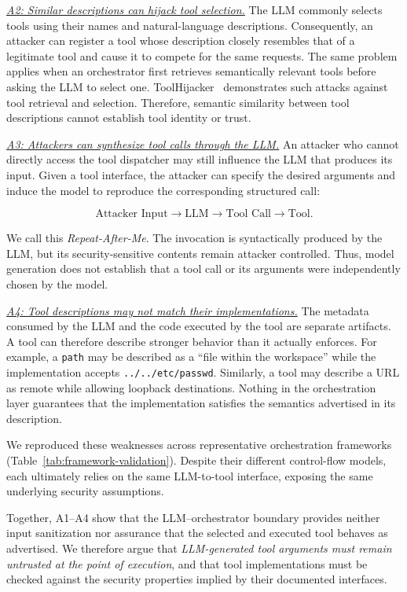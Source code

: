 \medskip
\noindent\textit{\underline{A2: Similar descriptions can hijack tool selection.}}
The LLM commonly selects tools using their names and natural-language
descriptions. Consequently, an attacker can register a tool whose description
closely resembles that of a legitimate tool and cause it to compete for the
same requests. The same problem applies when an orchestrator first retrieves
semantically relevant tools before asking the LLM to select one.
ToolHijacker~\cite{toolhijacker} demonstrates such attacks against tool
retrieval and selection. Therefore, semantic similarity between tool
descriptions cannot establish tool identity or trust.

\medskip
\noindent\textit{\underline{A3: Attackers can synthesize tool calls through the LLM.}}
An attacker who cannot directly access the tool dispatcher may still influence
the LLM that produces its input. Given a tool interface, the attacker can
specify the desired arguments and induce the model to reproduce the
corresponding structured call:

\[
\text{Attacker Input}
\rightarrow
\text{LLM}
\rightarrow
\text{Tool Call}
\rightarrow
\text{Tool}.
\]

We call this \emph{Repeat-After-Me}. The invocation is syntactically produced
by the LLM, but its security-sensitive contents remain attacker controlled.
Thus, model generation does not establish that a tool call or its arguments
were independently chosen by the model.

\medskip
\noindent\textit{\underline{A4: Tool descriptions may not match their implementations.}}
The metadata consumed by the LLM and the code executed by the tool are
separate artifacts. A tool can therefore describe stronger behavior than it
actually enforces. For example, a \texttt{path} may be described as a ``file
within the workspace'' while the implementation accepts
\texttt{../../etc/passwd}. Similarly, a tool may describe a URL as remote
while allowing loopback destinations. Nothing in the orchestration layer
guarantees that the implementation satisfies the semantics advertised in its
description.

\medskip
We reproduced these weaknesses across representative orchestration frameworks
(Table~\ref{tab:framework-validation}). Despite their different control-flow
models, each ultimately relies on the same LLM-to-tool interface, exposing the
same underlying security assumptions.



Together, A1--A4 show that the LLM--orchestrator boundary provides neither
input sanitization nor assurance that the selected and executed tool behaves
as advertised. We therefore argue that \emph{LLM-generated tool arguments
must remain untrusted at the point of execution}, and that tool
implementations must be checked against the security properties implied by
their documented interfaces.

